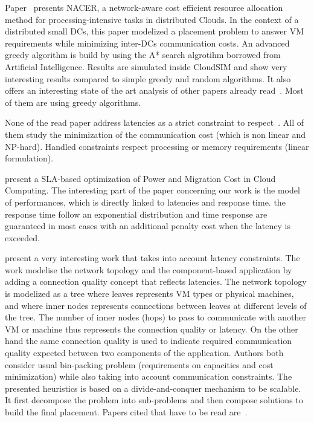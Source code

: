 \documentclass[
    a4paper, 
    12pt, onecolumn,
]{article}
\begin{document}
Paper~\cite{7371709} presents NACER, a network-aware cost efficient resource allocation method for
processing-intensive tasks in distributed Clouds. In the context of a distributed small DCs, this paper modelized a placement problem to answer VM requirements while minimizing inter-DCs communication costs. An advanced greedy algorithm is build by using the A* search algrotihm borrowed from Artificial Intelligence. Results are simulated inside CloudSIM and show very interesting results compared to simple greedy and random algorithms. It also offers an interesting state of the art analysis of other papers already read~\cite{Alicherry2012NetworkAR,6566850,7872914}. Most of them are using greedy algorithms.

None of the read paper address latencies as a strict constraint to respect~\cite{Alicherry2012NetworkAR,6566850,5662521,Steiner:2012:NSP:2377677.2377687,5461930,7872914}. All of them study the minimization of the communication cost (which is non linear and NP-hard). Handled constraints respect processing or memory requirements (linear formulation).

\cite{6217419} present a SLA-based optimization of Power and Migration Cost in Cloud Computing. The interesting part of the paper concerning our work is the model of performances, which is directly linked to latencies and response time. the response time follow an exponential distribution and time response are guaranteed in most cases with an additional penalty cost when the latency is exceeded.

\cite{silvaeuropar} present a very interesting work that takes into account latency constraints. The work modelise the network topology and the component-based application by adding a connection quality concept that reflects latencies. The network topology is modelized as a tree where leaves represents VM types or physical machines, and where inner nodes represents connections between leaves at different levels of the tree. The number of inner nodes (hops) to pass to communicate with another VM or machine thus represents the connection quality or latency. On the other hand the same connection quality is used to indicate required communication quality expected between two components of the application. Authors both consider usual bin-packing problem (requirements on capacities and cost minimization) while also taking into account communication constraints. The presented heuristics is based on a divide-and-conquer mechanism to be scalable. It first decompose the problem into sub-problems and then compose solutions to build the final placement. Papers cited that have to be read are~\cite{6253484,6256562,6495451,5461930}.
\end{document}

